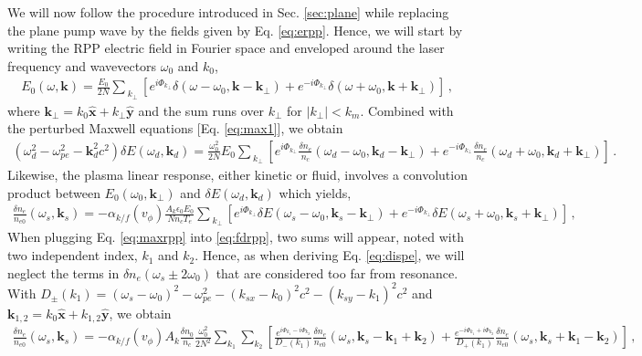 \documentclass[
 reprint,
 amsmath,amssymb,
 aps,
]{revtex4-1}
\begin{document}
 \begin{widetext}
We will now follow the procedure introduced in Sec. \ref{sec:plane} while replacing the plane pump wave by the fields given by Eq. \eqref{eq:erpp}. Hence, we will start by writing the RPP electric field in Fourier space and enveloped around the laser frequency and wavevectors $\omega_0$ and $k_0$,
\begin{align}
E_0(\omega,\mathbf{k}) = \frac{E_0}{2N} \sum_{\ k_{\perp} }[ e^{i\Phi_{k_\perp}}\delta(\omega-\omega_0, \mathbf{k}-\mathbf{k}_\perp)    + e^{-i\Phi_{k_\perp}}\delta(\omega+\omega_0, \mathbf{k}+\mathbf{k}_\perp) ]
\, , \label{eq:erppf}
\end{align}
 where $\mathbf{k}_\perp= k_0\hat{\mathbf{x}} +k_\perp \hat{\mathbf{y}}$ and the sum runs over $k_\perp$ for $\vert k_\perp\vert  <k_m$.
 Combined with the perturbed Maxwell equations [Eq. \eqref{eq:max1}], we obtain
 \begin{align}
    (\omega_d^2 - \omega_{pe}^2 -\mathbf{k}_d^2c^2)\delta E(\omega_d,\mathbf{k}_d) = \frac{\omega_0^2}{2N} E_0 \sum_{\ k_{\perp} }   \left[e^{i\Phi_{k_\perp}}\frac{\delta n_e }{n_c}(\omega_d-\omega_0, \mathbf{k}_d-\mathbf{k}_\perp) +e^{-i\Phi_{k_\perp}}\frac{\delta n_e }{n_c}(\omega_d+\omega_0, \mathbf{k}_d+\mathbf{k}_\perp) \right] \, .\label{eq:maxrpp}
\end{align}
Likewise, the plasma linear response, either kinetic or fluid, involves a convolution product between $E_0(\omega_0,\mathbf{k}_\perp)$ and $\delta E(\omega_d,\mathbf{k}_d)$ which yields,
\begin{align}
   \frac{\delta n_e }{n_{e0}}(\omega_s,\mathbf{k}_s) = -\alpha_{k/f}(v_\phi) \frac{A_k\epsilon_0 E_0}{Nn_c T_e} \sum_{\ k_{\perp} }     \left[e^{i\Phi_{k_\perp}}\delta E(\omega_s-\omega_0, \mathbf{k}_s-\mathbf{k}_{\perp}) +e^{-i\Phi_{k_\perp}}\delta E(\omega_s+\omega_0, \mathbf{k}_s+\mathbf{k}_{\perp}) \right] \, ,\label{eq:fdrpp} 
\end{align}
When plugging Eq. \eqref{eq:maxrpp} into \eqref{eq:fdrpp}, two sums will appear, noted with two independent index, $k_1$ and $k_2$. Hence, as when  deriving Eq. \eqref{eq:dispe}, we will neglect the terms in $\delta n_e(\omega_s\pm 2\omega_0)$ that are considered too far from resonance. With $D_\pm(k_{1})= (\omega_s-\omega_0)^2 - \omega_{pe}^2 -( k_{sx}-k_0) ^2c^2 -( k_{sy}-k_{1}) ^2c^2$ and $\mathbf{k}_{1,2}= k_0\hat{\mathbf{x}} +k_{1,2} \hat{\mathbf{y}}$, we obtain
\begin{align}
   \frac{\delta n_e }{n_{e0}}(\omega_s,\mathbf{k}_s) = -\alpha_{k/f}(v_\phi)A_k \frac{\delta n_0}{n_c} \frac{\omega_0^2}{2N^2}\sum_{ k_{1} } \sum_{ k_{2} }        \left[ \frac{e^{i\Phi_{k_1}-i\Phi_{k_2}} }{D_-(k_{1})}\frac{\delta n_e }{n_{e0}}(\omega_s,\mathbf{k}_s-\mathbf{k}_{1}+\mathbf{k}_{2}) +\frac{e^{-i\Phi_{k_1}+i\Phi_{k_2}}}{D_+(k_{1})} \frac{\delta n_e }{n_{e0}}(\omega_s,\mathbf{k}_s+\mathbf{k}_{1}-\mathbf{k}_{2}) \right] \, ,\label{eq:fddrpp} 
\end{align}
 \end{widetext}
 
\end{document}
